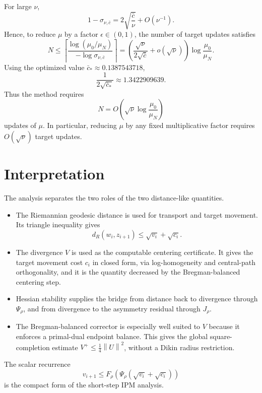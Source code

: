 \documentclass[11pt]{article}
\newcommand{\norm}[1]{\left\|#1\right\|}
\newcommand{\distR}{d_R}
\begin{document}
For large $\nu$,
\begin{equation}
  1-\sigma_{\nu,\bar c}
  =2\sqrt{\frac{\bar c}{\nu}}+O(\nu^{-1}).              \label{eq:sigma-asymptotic}
\end{equation}
Hence, to reduce $\mu$ by a factor $\epsilon\in(0,1)$, the number of target updates satisfies
\begin{equation}
  N
  \le
  \left\lceil
  \frac{\log(\mu_0/\mu_N)}{-\log\sigma_{\nu,\bar c}}
  \right\rceil
  =
  \left(\frac{\sqrt\nu}{2\sqrt{\bar c}}+o(\sqrt\nu)\right)
  \log\frac{\mu_0}{\mu_N}.                              \label{eq:N-asymptotic}
\end{equation}
Using the optimized value $\bar c_*\approx0.1387543718$,
\begin{equation}
  \frac{1}{2\sqrt{\bar c_*}}\approx1.3422909639.          \label{eq:short-step-constant}
\end{equation}
Thus the method requires
\begin{equation}
  N=O\left(\sqrt\nu\log\frac{\mu_0}{\mu_N}\right)
\end{equation}
updates of $\mu$.  In particular, reducing $\mu$ by any fixed multiplicative factor requires $O(\sqrt\nu)$ target updates.

\section{Interpretation}

The analysis separates the two roles of the two distance-like quantities.
\begin{itemize}[leftmargin=2em]
\item The Riemannian geodesic distance is used for transport and target movement.  Its triangle inequality gives
\[
  \distR(w_i,z_{i+1})\le \sqrt{v_i}+\sqrt{c_i}.
\]
\item The divergence $V$ is used as the computable centering certificate.  It gives the target movement cost $c_i$ in closed form, via log-homogeneity and central-path orthogonality, and it is the quantity decreased by the Bregman-balanced centering step.
\item Hessian stability supplies the bridge from distance back to divergence through $\Psi_\rho$, and from divergence to the asymmetry residual through $J_\rho$.
\item The Bregman-balanced corrector is especially well suited to $V$ because it enforces a primal-dual endpoint balance.  This gives the global square-completion estimate $V^+\le \frac14\norm{U}^2$, without a Dikin radius restriction.
\end{itemize}

The scalar recurrence
\[
  v_{i+1}\le F_\rho\left(\Psi_\rho(\sqrt{v_i}+\sqrt{c_i})\right)
\]
is the compact form of the short-step IPM analysis.
\end{document}
